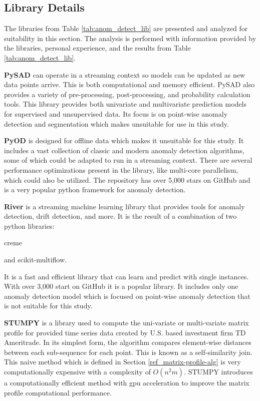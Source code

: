 

\subsection{Library Details}

The libraries from Table \ref{tab:anom_detect_lib} are presented and analyzed for suitability in this section. The analysis is performed with information provided by the libraries, personal experience, and the results from Table \ref{tab:anom_detect_lib}.

\textbf{PySAD} \parencite{pysad} can operate in a streaming context so models can be updated as new data points arrive.
This is both computational and memory efficient.
PySAD also provides a variety of pre-processing, post-processing, and probability calculation tools.
This library provides both univariate and multivariate prediction models for supervised and unsupervised data.
Its focus is on point-wise anomaly detection and segmentation which makes unsuitable for use in this study.


\textbf{PyOD} \parencite{zhao2019pyod} is designed for offline data which makes it unsuitable for this study.
It includes a vast collection of classic and modern anomaly detection algorithms, some of which could be adapted to run in a streaming context.
There are several performance optimizations present in the library, like multi-core parallelism, which could also be utilized.
The repository has over 5,000 stars on GitHub and is a very popular python framework for anomaly detection.

\textbf{River} \parencite{2020river} is a streaming machine learning library that provides tools for anomaly detection, drift detection, and more.
It is the result of a combination of two python libraries:
\begin{inlinelist}
    \item creme
    \item and scikit-multiflow.
\end{inlinelist} 
It is a fast and efficient library that can learn and predict with single instances.
With over 3,000 start on GitHub it is a popular library.
It includes only one anomaly detection model which is focused on point-wise anomaly detection that is not suitable for this study.

\textbf{STUMPY} \parencite{law2019stumpy} is a library used to compute the uni-variate or multi-variate matrix profile for provided time series data created by U.S. based investment firm TD Ameritrade.
In its simplest form, the algorithm compares element-wise distances between each sub-sequence for each point.
This is known as a self-similarity join.
This naive method which is defined in Section \ref{ref_matrix-profile-alg} is very computationally expensive with a complexity of $O(n^2m)$.
STUMPY introduces a computationally efficient method with gpu acceleration to improve the matrix profile computational performance.

